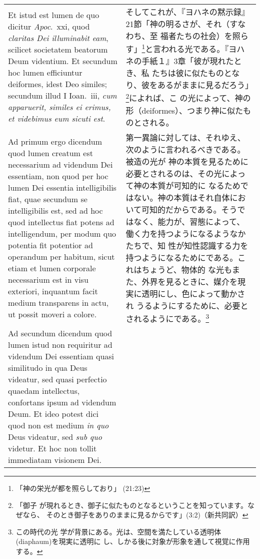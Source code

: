\documentclass[10pt]{jsarticle} %
\begin{document}
\begin{longtable}{p{21em}p{21em}}
\\

Et istud est lumen de quo
dicitur {\it Apoc}.~{\sc xxi}, quod {\it claritas Dei illuminabit
eam}, scilicet societatem beatorum Deum videntium. Et secundum hoc
lumen efficiuntur deiformes, idest Deo similes; secundum illud I
Ioan.\ {\sc iii}, {\it cum apparuerit, similes ei erimus, et videbimus
eum sicuti est}.

&

そしてこれが、『ヨハネの黙示録』21節「神の明るさが、それ（すなわち、至
福者たちの社会）を照らす」\footnote{「神の栄光が都を照らしており」
(21:23)}と言われる光である。『ヨハネの手紙１』3章「彼が現れたとき、私
たちは彼に似たものとなり、彼をあるがままに見るだろう」\footnote{「御子
が現れるとき、御子に似たものとなるということを知っています。なぜなら、
そのとき御子をありのままに見るからです」(3:2)（新共同訳）}によれば、こ
の光によって、神の形（deiformes）、つまり神に似たものとされる。

\\

{\sc Ad primum ergo dicendum} quod lumen creatum est necessarium ad
videndum Dei essentiam, non quod per hoc lumen Dei essentia
intelligibilis fiat, quae secundum se intelligibilis est, sed ad hoc
quod intellectus fiat potens ad intelligendum, per modum quo potentia
fit potentior ad operandum per habitum, sicut etiam et lumen corporale
necessarium est in visu exteriori, inquantum facit medium transparens
in actu, ut possit moveri a colore.

&

第一異論に対しては、それゆえ、次のように言われるべきである。被造の光が
神の本質を見るために必要とされるのは、その光によって神の本質が可知的に
なるためではない。神の本質はそれ自体において可知的だからである。そうで
はなく、能力が、習態によって、働く力を持つようになるようなかたちで、知
性が知性認識する力を持つようになるためにである。これはちょうど、物体的
な光もまた、外界を見るときに、媒介を現実に透明にし、色によって動かされ
うるようにするために、必要とされるようにである。\footnote{この時代の光
学が背景にある。光は、空間を満たしている透明体(diaphaum)を現実に透明に
し、しかる後に対象が形象を通して視覚に作用する。}

\\

{\sc Ad secundum dicendum} quod lumen istud non requiritur ad videndum
Dei essentiam quasi similitudo in qua Deus videatur, sed quasi
perfectio quaedam intellectus, confortans ipsum ad videndum Deum. Et
ideo potest dici quod non est medium {\it in quo} Deus videatur, sed
{\it sub quo} videtur. Et hoc non tollit immediatam visionem Dei.


\end{longtable}
\end{document}

